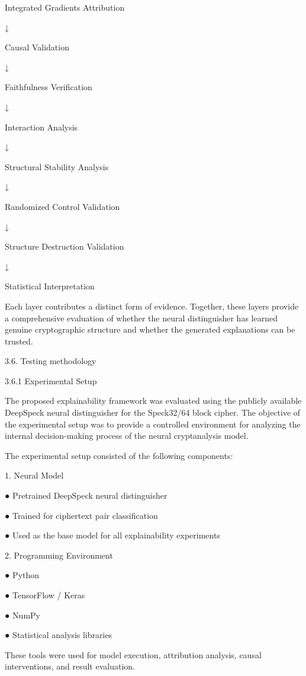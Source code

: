 Integrated Gradients Attribution 

          ↓ 

Causal Validation 

          ↓ 

      Faithfulness Verification 

          ↓ 

         Interaction Analysis 

          ↓ 


    Structural Stability Analysis 

          ↓ 

Randomized Control Validation 

          ↓ 

Structure Destruction Validation 

↓ 

        Statistical Interpretation 

Each layer contributes a distinct form of evidence. Together, these layers provide a 
comprehensive evaluation of whether the neural distinguisher has learned genuine cryptographic 
structure and whether the generated explanations can be trusted. 

3.6. Testing methodology 

3.6.1 Experimental Setup 

The proposed explainability framework was evaluated using the publicly available DeepSpeck 
neural distinguisher for the Speck32/64 block cipher. The objective of the experimental setup 
was to provide a controlled environment for analyzing the internal decision-making process of 
the neural cryptanalysis model. 

The experimental setup consisted of the following components: 

1. Neural Model 

●  Pretrained DeepSpeck neural distinguisher 

●  Trained for ciphertext pair classification 

●  Used as the base model for all explainability experiments 

2. Programming Environment 

●  Python 

●  TensorFlow / Keras 

●  NumPy 

●  Statistical analysis libraries 

These tools were used for model execution, attribution analysis, causal interventions, and result 
evaluation. 

